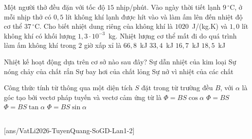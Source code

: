 	\begin{ex}%
		Một người thở đều đặn với tốc độ $15$ nhịp/phút. Vào ngày thời tiết lạnh $9\,^\circ\text{C}$, ở mỗi nhịp thở có $0{,}5$ lít không khí lạnh được hít vào và làm ấm lên đến nhiệt độ cơ thể $37\,^\circ\text{C}$. Cho biết nhiệt dung riêng của không khí là $1020$~J/(kg.K) và $1{,}0$ lít không khí có khối lượng $1{,}3\cdot 10^{-3}$~kg. Nhiệt lượng cơ thể mất đi do quá trình làm ấm không khí trong $2$ giờ xấp xỉ là
		\choice
		{$66{,}8$~kJ}
		{\True $33{,}4$~kJ}
		{$16{,}7$~kJ}
		{$18{,}5$~kJ}
	\end{ex}

	\begin{ex}%
		Nhiệt kế hoạt động dựa trên cơ sở nào sau đây?
		\choice
		{Sự dẫn nhiệt của kim loại}
		{Sự nóng chảy của chất rắn}
		{Sự bay hơi của chất lỏng}
		{\True Sự nở vì nhiệt của các chất}
	\end{ex}

	\begin{ex}%
		Công thức tính từ thông qua một diện tích $S$ đặt trong từ trường đều $B$, với $\alpha$ là góc tạo bởi vectơ pháp tuyến và vectơ cảm ứng từ là
		\choice
		{\True $\Phi=BS\cos\alpha$}
		{$\Phi=BS$}
		{$\Phi=BS\tan\alpha$}
		{$\Phi=BS\sin\alpha$}
	\end{ex}

	\subsection*{}
	\setcounter{ex}{0}
	[ans/VatLi2026-TuyenQuang-SoGD-Lan1-2]

